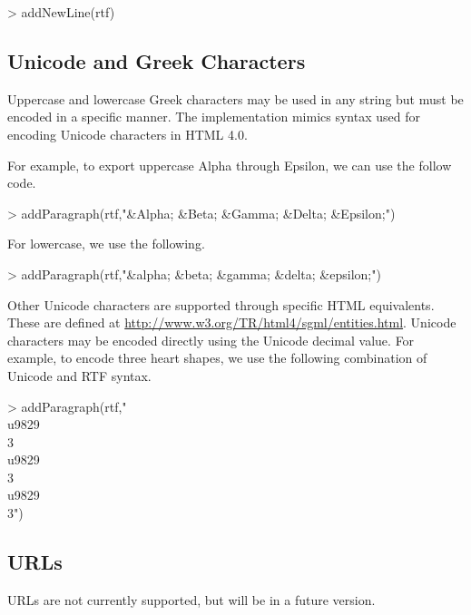 \documentclass[11pt,letterpaper]{article}
\begin{document}
\begin{Schunk}
\begin{Sinput}
> addNewLine(rtf)
\end{Sinput}
\end{Schunk}




\subsection{Unicode and Greek Characters}
Uppercase and lowercase Greek characters may be used in any string but must be encoded in a specific manner.  The implementation mimics syntax used for encoding Unicode characters in HTML 4.0.  

For example, to export uppercase Alpha through Epsilon, we can use the follow code.

\begin{Schunk}
\begin{Sinput}
> addParagraph(rtf,"&Alpha; &Beta; &Gamma; &Delta; &Epsilon;\n\n")
\end{Sinput}
\end{Schunk}

For lowercase, we use the following.

\begin{Schunk}
\begin{Sinput}
> addParagraph(rtf,"&alpha; &beta; &gamma; &delta; &epsilon;\n\n")
\end{Sinput}
\end{Schunk}


Other Unicode characters are supported through specific HTML equivalents.  These are defined at \url{http://www.w3.org/TR/html4/sgml/entities.html}.  Unicode characters may be encoded directly using the Unicode decimal value.  For example, to encode three heart shapes, we use the following combination of Unicode and RTF syntax. 

\begin{Schunk}
\begin{Sinput}
> addParagraph(rtf,"\\u9829\\3 \\u9829\\3 \\u9829\\3\n\n")
\end{Sinput}
\end{Schunk}


\subsection{URLs}
URLs are not currently supported, but will be in a future version.
\end{document}
